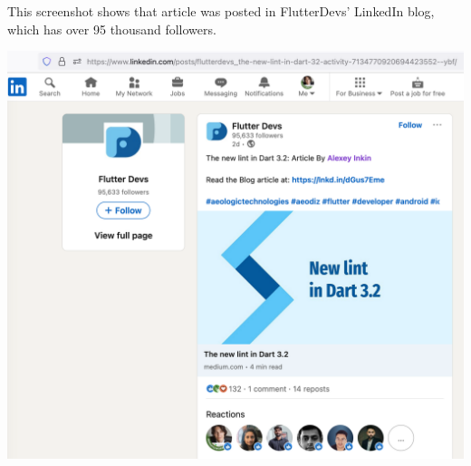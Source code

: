 
This screenshot shows that \mrls article was posted
in FlutterDevs' LinkedIn blog,
which has over 95 thousand followers.

\begin{center}
    \includegraphics[width=\textwidth]{flutter-devs-post}
\end{center}

\pagebreak
